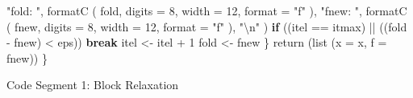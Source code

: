\documentclass[
  12pt,
]{book}
\newenvironment{Shaded}{\begin{snugshade}}{\end{snugshade}}
\newcommand{\AttributeTok}[1]{\textcolor[rgb]{0.77,0.63,0.00}{#1}}
\newcommand{\ControlFlowTok}[1]{\textcolor[rgb]{0.13,0.29,0.53}{\textbf{#1}}}
\newcommand{\DecValTok}[1]{\textcolor[rgb]{0.00,0.00,0.81}{#1}}
\newcommand{\FunctionTok}[1]{\textcolor[rgb]{0.00,0.00,0.00}{#1}}
\newcommand{\NormalTok}[1]{#1}
\newcommand{\OtherTok}[1]{\textcolor[rgb]{0.56,0.35,0.01}{#1}}
\newcommand{\SpecialCharTok}[1]{\textcolor[rgb]{0.00,0.00,0.00}{#1}}
\newcommand{\StringTok}[1]{\textcolor[rgb]{0.31,0.60,0.02}{#1}}
\begin{document}
\begin{Shaded}
\begin{Highlighting}[]
          \StringTok{"fold: "}\NormalTok{,}
          \FunctionTok{formatC}\NormalTok{ (}
\NormalTok{            fold,}
            \AttributeTok{digits =} \DecValTok{8}\NormalTok{,}
            \AttributeTok{width =} \DecValTok{12}\NormalTok{,}
            \AttributeTok{format =} \StringTok{"f"}
\NormalTok{          ),}
          \StringTok{"fnew: "}\NormalTok{,}
          \FunctionTok{formatC}\NormalTok{ (}
\NormalTok{            fnew,}
            \AttributeTok{digits =} \DecValTok{8}\NormalTok{,}
            \AttributeTok{width =} \DecValTok{12}\NormalTok{,}
            \AttributeTok{format =} \StringTok{"f"}
\NormalTok{          ),}
          \StringTok{"}\SpecialCharTok{\textbackslash{}n}\StringTok{"}
\NormalTok{        )}
      \ControlFlowTok{if}\NormalTok{ ((itel }\SpecialCharTok{==}\NormalTok{ itmax) }\SpecialCharTok{||}\NormalTok{ ((fold }\SpecialCharTok{{-}}\NormalTok{ fnew) }\SpecialCharTok{\textless{}}\NormalTok{ eps))}
        \ControlFlowTok{break}
\NormalTok{      itel }\OtherTok{\textless{}{-}}\NormalTok{ itel }\SpecialCharTok{+} \DecValTok{1}
\NormalTok{      fold }\OtherTok{\textless{}{-}}\NormalTok{ fnew}
\NormalTok{    \}}
    \FunctionTok{return}\NormalTok{ (}\FunctionTok{list}\NormalTok{ (}\AttributeTok{x =}\NormalTok{ x, }\AttributeTok{f =}\NormalTok{ fnew))}
\NormalTok{  \}}
\end{Highlighting}
\end{Shaded}

Code Segment 1: Block Relaxation
\end{document}
